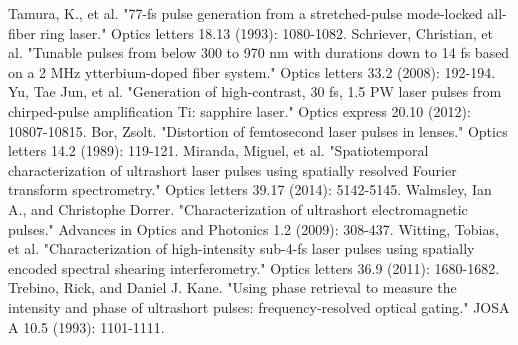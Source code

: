 \documentclass[12pt,a4paper,twoside]{article}
\begin{document}
\clearpage
\begin{thebibliography}{99}
 Tamura, K., et al. "77-fs pulse generation from a stretched-pulse mode-locked all-fiber ring laser." Optics letters 18.13 (1993): 1080-1082.
 Schriever, Christian, et al. "Tunable pulses from below 300 to 970 nm with durations down to 14 fs based on a 2 MHz ytterbium-doped fiber system." Optics letters 33.2 (2008): 192-194.
 Yu, Tae Jun, et al. "Generation of high-contrast, 30 fs, 1.5 PW laser pulses from chirped-pulse amplification Ti: sapphire laser." Optics express 20.10 (2012): 10807-10815.
 Bor, Zsolt. "Distortion of femtosecond laser pulses in lenses." Optics letters 14.2 (1989): 119-121.
 Miranda, Miguel, et al. "Spatiotemporal characterization of ultrashort laser pulses using spatially resolved Fourier transform spectrometry." Optics letters 39.17 (2014): 5142-5145.
 Walmsley, Ian A., and Christophe Dorrer. "Characterization of ultrashort electromagnetic pulses." Advances in Optics and Photonics 1.2 (2009): 308-437.
 Witting, Tobias, et al. "Characterization of high-intensity sub-4-fs laser pulses using spatially encoded spectral shearing interferometry." Optics letters 36.9 (2011): 1680-1682.
 Trebino, Rick, and Daniel J. Kane. "Using phase retrieval to measure the intensity and phase of ultrashort pulses: frequency-resolved optical gating." JOSA A 10.5 (1993): 1101-1111.


\end{thebibliography}
\end{document}
